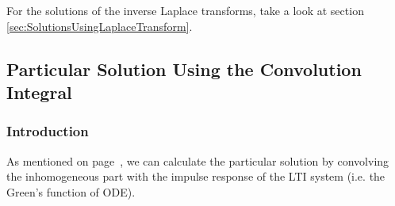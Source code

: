 For the solutions of the inverse Laplace transforms, take a look at section \ref{sec:SolutionsUsingLaplaceTransform}.
\clearpage
\subsection{Particular Solution Using the Convolution Integral}
\subsubsection{Introduction}
As mentioned on page~\pageref{pg:sig_sys_ex_03AddOn:convolution}, we can calculate
the particular solution by convolving the inhomogeneous part with the impulse
response of the LTI system (i.e. the Green's function of ODE).


